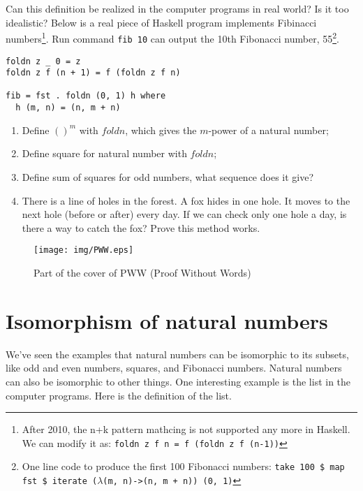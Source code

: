 \documentclass[UTF8]{article}
\begin{document}
Can this definition be realized in the computer programs in real world? Is it too idealistic? Below is a real piece of Haskell program implements Fibinacci numbers\footnote{After 2010, the n+k pattern mathcing is not supported any more in Haskell. We can modify it as: \newline\texttt{foldn z f n = f (foldn z f (n-1))}}. Run command \texttt{fib 10} can output the 10th Fibonacci number, 55\footnote{One line code to produce the first 100 Fibonacci numbers: \newline\texttt{take 100 \$ map fst \$ iterate ($\lambda$(m, n)->(n, m + n)) (0, 1)}}.

\lstset{frame=single}
\begin{lstlisting}
foldn z _ 0 = z
foldn z f (n + 1) = f (foldn z f n)

fib = fst . foldn (0, 1) h where
  h (m, n) = (n, m + n)
\end{lstlisting}

\begin{Exercise}
\begin{enumerate}
\item Define $()^m$ with $foldn$, which gives the $m$-power of a natural number;
\item Define square for natural number with $foldn$;
\item Define sum of squares for odd numbers, what sequence does it give?
\item There is a line of holes in the forest. A fox hides in one hole. It moves to the next hole (before or after) every day. If we can check only one hole a day, is there a way to catch the fox? Prove this method works\cite{Gusen2014}.
\end{enumerate}
\end{Exercise}

\begin{figure}[htbp]
 \centering
 \texttt{[image: img/PWW.eps]}
 \caption{Part of the cover of PWW (Proof Without Words)}
 \label{fig:PWW}
\end{figure}

\section{Isomorphism of natural numbers}

We've seen the examples that natural numbers can be isomorphic to its subsets, like odd and even numbers, squares, and Fibonacci numbers. Natural numbers can also be isomorphic to other things. One interesting example is the list in the computer programs. Here is the definition of the list.
\end{document}
